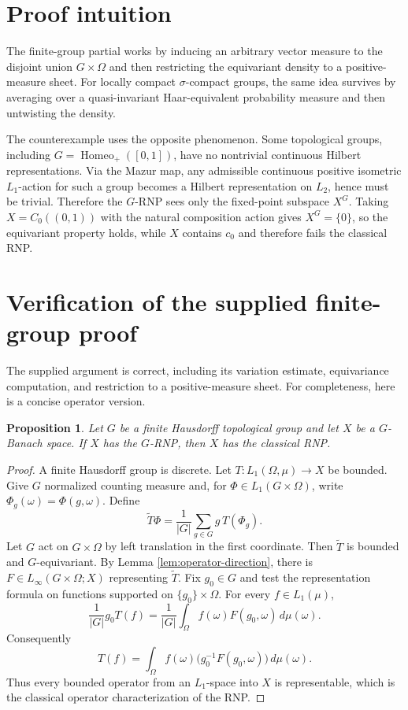 \documentclass[11pt]{article}
\newtheorem{proposition}[theorem]{Proposition}
\theoremstyle{remark}
\newcommand{\Homeo}{\operatorname{Homeo}}
\begin{document}
\section{Proof intuition}

The finite-group partial works by inducing an arbitrary vector measure to
the disjoint union $G\times\Omega$ and then restricting the equivariant
density to a positive-measure sheet.  For locally compact
$\sigma$-compact groups, the same idea survives by averaging over a
quasi-invariant Haar-equivalent probability measure and then untwisting the
density.

The counterexample uses the opposite phenomenon.  Some topological groups,
including $G=\Homeo_+([0,1])$, have no nontrivial continuous Hilbert
representations.  Via the Mazur map, any admissible continuous positive
isometric $L_1$-action for such a group becomes a Hilbert representation on
$L_2$, hence must be trivial.  Therefore the $G$-RNP sees only the fixed-point
subspace $X^G$.  Taking $X=C_0((0,1))$ with the natural composition action
gives $X^G=\{0\}$, so the equivariant property holds, while $X$ contains
$c_0$ and therefore fails the classical RNP.

\section{Verification of the supplied finite-group proof}

The supplied argument is correct, including its variation estimate,
equivariance computation, and restriction to a positive-measure sheet.  For
completeness, here is a concise operator version.

\begin{proposition}\label{prop:finite}
Let $G$ be a finite Hausdorff topological group and let $X$ be a
$G$-Banach space.  If $X$ has the $G$-RNP, then $X$ has the classical RNP.
\end{proposition}

\begin{proof}
A finite Hausdorff group is discrete.  Let
$T:L_1(\Omega,\mu)\to X$ be bounded.  Give $G$ normalized counting measure
and, for $\Phi\in L_1(G\times\Omega)$, write
$\Phi_g(\omega)=\Phi(g,\omega)$.  Define
\[
  \widetilde T\Phi
  =\frac1{|G|}\sum_{g\in G}g\,T(\Phi_g).
\]
Let $G$ act on $G\times\Omega$ by left translation in the first coordinate.
Then $\widetilde T$ is bounded and $G$-equivariant.  By Lemma
\ref{lem:operator-direction}, there is
$F\in L_\infty(G\times\Omega;X)$ representing $\widetilde T$.
Fix $g_0\in G$ and test the representation formula on functions supported on
$\{g_0\}\times\Omega$.  For every $f\in L_1(\mu)$,
\[
  \frac1{|G|}g_0T(f)
  =\frac1{|G|}\int_\Omega f(\omega)F(g_0,\omega)\,d\mu(\omega).
\]
Consequently
\[
  T(f)=\int_\Omega f(\omega)
  \bigl(g_0^{-1}F(g_0,\omega)\bigr)\,d\mu(\omega).
\]
Thus every bounded operator from an $L_1$-space into $X$ is representable,
which is the classical operator characterization of the RNP.
\end{proof}
\end{document}
